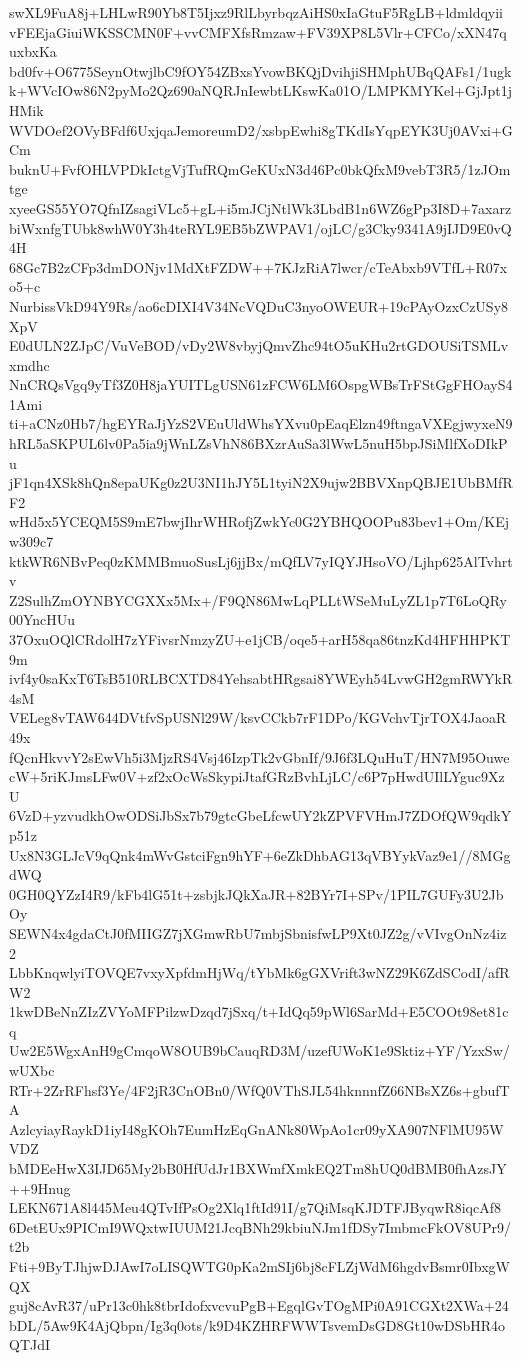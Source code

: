 swXL9FuA8j+LHLwR90Yb8T5Ijxz9RlLbyrbqzAiHS0xIaGtuF5RgLB+ldmldqyii
vFEEjaGiuiWKSSCMN0F+vvCMFXfsRmzaw+FV39XP8L5Vlr+CFCo/xXN47quxbxKa
bd0fv+O6775SeynOtwjlbC9fOY54ZBxsYvowBKQjDvihjiSHMphUBqQAFs1/1ugk
k+WVcIOw86N2pyMo2Qz690aNQRJnIewbtLKswKa01O/LMPKMYKel+GjJpt1jHMik
WVDOef2OVyBFdf6UxjqaJemoreumD2/xsbpEwhi8gTKdIsYqpEYK3Uj0AVxi+GCm
buknU+FvfOHLVPDkIctgVjTufRQmGeKUxN3d46Pc0bkQfxM9vebT3R5/1zJOmtge
xyeeGS55YO7QfnIZsagiVLc5+gL+i5mJCjNtlWk3LbdB1n6WZ6gPp3I8D+7axarz
biWxnfgTUbk8whW0Y3h4teRYL9EB5bZWPAV1/ojLC/g3Cky9341A9jIJD9E0vQ4H
68Gc7B2zCFp3dmDONjv1MdXtFZDW++7KJzRiA7lwcr/cTeAbxb9VTfL+R07xo5+c
NurbissVkD94Y9Rs/ao6cDIXI4V34NcVQDuC3nyoOWEUR+19cPAyOzxCzUSy8XpV
E0dULN2ZJpC/VuVeBOD/vDy2W8vbyjQmvZhc94tO5uKHu2rtGDOUSiTSMLvxmdhc
NnCRQsVgq9yTf3Z0H8jaYUITLgUSN61zFCW6LM6OspgWBsTrFStGgFHOayS41Ami
ti+aCNz0Hb7/hgEYRaJjYzS2VEuUldWhsYXvu0pEaqElzn49ftngaVXEgjwyxeN9
hRL5aSKPUL6lv0Pa5ia9jWnLZsVhN86BXzrAuSa3lWwL5nuH5bpJSiMlfXoDIkPu
jF1qn4XSk8hQn8epaUKg0z2U3NI1hJY5L1tyiN2X9ujw2BBVXnpQBJE1UbBMfRF2
wHd5x5YCEQM5S9mE7bwjIhrWHRofjZwkYc0G2YBHQOOPu83bev1+Om/KEjw309c7
ktkWR6NBvPeq0zKMMBmuoSusLj6jjBx/mQfLV7yIQYJHsoVO/Ljhp625AlTvhrtv
Z2SulhZmOYNBYCGXXx5Mx+/F9QN86MwLqPLLtWSeMuLyZL1p7T6LoQRy00YncHUu
37OxuOQlCRdolH7zYFivsrNmzyZU+e1jCB/oqe5+arH58qa86tnzKd4HFHHPKT9m
ivf4y0saKxT6TsB510RLBCXTD84YehsabtHRgsai8YWEyh54LvwGH2gmRWYkR4sM
VELeg8vTAW644DVtfvSpUSNl29W/ksvCCkb7rF1DPo/KGVchvTjrTOX4JaoaR49x
fQcnHkvvY2sEwVh5i3MjzRS4Vsj46IzpTk2vGbnIf/9J6f3LQuHuT/HN7M95Ouwe
cW+5riKJmsLFw0V+zf2xOcWsSkypiJtafGRzBvhLjLC/c6P7pHwdUIlLYguc9XzU
6VzD+yzvudkhOwODSiJbSx7b79gtcGbeLfcwUY2kZPVFVHmJ7ZDOfQW9qdkYp51z
Ux8N3GLJcV9qQnk4mWvGstciFgn9hYF+6eZkDhbAG13qVBYykVaz9e1//8MGgdWQ
0GH0QYZzI4R9/kFb4lG51t+zsbjkJQkXaJR+82BYr7I+SPv/1PIL7GUFy3U2JbOy
SEWN4x4gdaCtJ0fMIIGZ7jXGmwRbU7mbjSbnisfwLP9Xt0JZ2g/vVIvgOnNz4iz2
LbbKnqwlyiTOVQE7vxyXpfdmHjWq/tYbMk6gGXVrift3wNZ29K6ZdSCodI/afRW2
1kwDBeNnZIzZVYoMFPilzwDzqd7jSxq/t+IdQq59pWl6SarMd+E5COOt98et81cq
Uw2E5WgxAnH9gCmqoW8OUB9bCauqRD3M/uzefUWoK1e9Sktiz+YF/YzxSw/wUXbc
RTr+2ZrRFhsf3Ye/4F2jR3CnOBn0/WfQ0VThSJL54hknnnfZ66NBsXZ6s+gbufTA
AzlcyiayRaykD1iyI48gKOh7EumHzEqGnANk80WpAo1cr09yXA907NFlMU95WVDZ
bMDEeHwX3IJD65My2bB0HfUdJr1BXWmfXmkEQ2Tm8hUQ0dBMB0fhAzsJY++9Hnug
LEKN671A8l445Meu4QTvIfPsOg2Xlq1ftId91I/g7QiMsqKJDTFJByqwR8iqcAf8
6DetEUx9PICmI9WQxtwIUUM21JcqBNh29kbiuNJm1fDSy7ImbmcFkOV8UPr9/t2b
Fti+9ByTJhjwDJAwI7oLISQWTG0pKa2mSIj6bj8cFLZjWdM6hgdvBsmr0IbxgWQX
guj8cAvR37/uPr13c0hk8tbrIdofxvcvuPgB+EgqlGvTOgMPi0A91CGXt2XWa+24
bDL/5Aw9K4AjQbpn/Ig3q0ots/k9D4KZHRFWWTsvemDsGD8Gt10wDSbHR4oQTJdI
